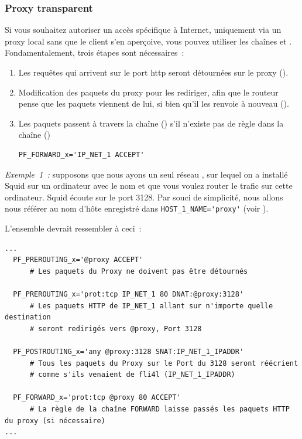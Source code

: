 \subsubsection{Proxy transparent}

Si vous souhaitez autoriser un accès spécifique à Internet, uniquement via un
proxy local sans que le client s'en aperçoive, vous pouvez utiliser les
chaînes  et . Fondamentalement,
trois étapes sont nécessaires~:

\begin{enumerate}
\item Les requêtes qui arrivent sur le port http seront
  détournées sur le proxy ().
\item Modification des paquets du proxy pour les rediriger, afin que le routeur
  pense que les paquets viennent de lui, si bien qu'il les renvoie à
  nouveau ().
\item Les paquets passent à travers la chaîne ()
  s'il n'existe pas de règle dans la chaîne ()

\begin{example}
\begin{verbatim}
PF_FORWARD_x='IP_NET_1 ACCEPT'
\end{verbatim}
\end{example}
\end{enumerate}

\emph{Exemple~1~:} supposons que nous ayons un seul réseau ,
sur lequel on a installé Squid sur un ordinateur avec le nom  et
que vous voulez router le trafic  sur cette ordinateur. Squid
écoute sur le port 3128. Par souci de simplicité, nous allons nous référer au
nom d'hôte  enregistré dans \verb+HOST_1_NAME='proxy'+ (voir
).

L'ensemble devrait ressembler à ceci~:

\begin{example}
\begin{verbatim}
...
  PF_PREROUTING_x='@proxy ACCEPT'
      # Les paquets du Proxy ne doivent pas être détournés

  PF_PREROUTING_x='prot:tcp IP_NET_1 80 DNAT:@proxy:3128'
      # Les paquets HTTP de IP_NET_1 allant sur n'importe quelle destination
      # seront redirigés vers @proxy, Port 3128

  PF_POSTROUTING_x='any @proxy:3128 SNAT:IP_NET_1_IPADDR'
      # Tous les paquets du Proxy sur le Port du 3128 seront réécrient
      # comme s'ils venaient de fli4l (IP_NET_1_IPADDR)

  PF_FORWARD_x='prot:tcp @proxy 80 ACCEPT'
      # La règle de la chaîne FORWARD laisse passés les paquets HTTP du proxy (si nécessaire)
...
\end{verbatim}
\end{example}

